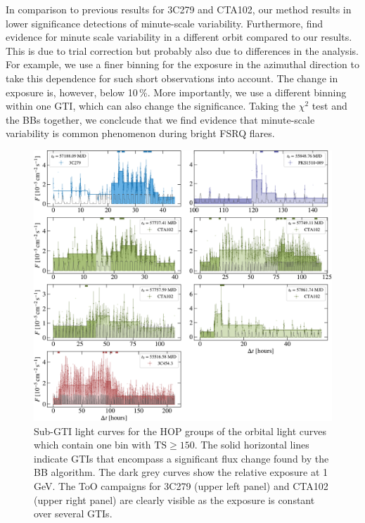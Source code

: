 \documentclass[twocolumn,linenumbers]{aastex62}
\begin{document}
In comparison to previous results for 3C279 and CTA102, our method results in lower significance detections of minute-scale variability.
Furthermore, \citet{2018ApJ...854L..26S} find evidence for minute scale variability in a different orbit compared to our results.
This is due to trial correction but probably also due to differences in the analysis.
For example, we use a finer binning for the exposure in the azimuthal direction to take this dependence for such short observations into account.
The change in exposure is, however, below 10\,\%.
More importantly, we use a different binning within one GTI, which can also change the significance. 
Taking the $\chi^2$ test and the BBs together, we conclcude that we find evidence that minute-scale variability is common phenomenon during bright FSRQ flares. %
\begin{figure}
    \centering
    \includegraphics[width = .9\linewidth]{lc_minute_3min.pdf}
    \caption{Sub-GTI light curves for the HOP groups of the orbital light curves which contain one bin with $\mathrm{TS} \geqslant 150$. The solid horizontal lines indicate GTIs that encompass a significant flux change found by the BB algorithm. The dark grey curves show the relative exposure at 1\,GeV. The ToO campaigns for 3C279 (upper left panel) and CTA102 (upper right panel) are clearly visible as the exposure is constant over several GTIs. }
    \label{fig:lc_minutes}
\end{figure}
\end{document}
